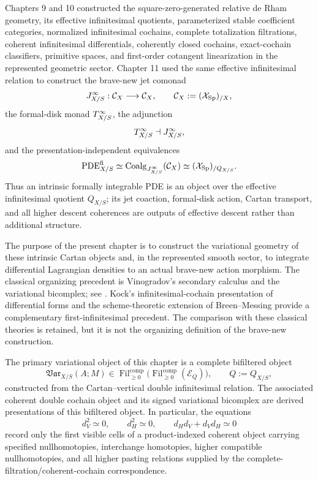 Chapters 9 and 10 constructed the square-zero-generated relative de Rham geometry, its effective infinitesimal quotients, parameterized stable coefficient categories, normalized infinitesimal cochains, complete totalization filtrations, coherent infinitesimal differentials, coherently closed cochains, exact-cochain classifiers, primitive spaces, and first-order cotangent linearization in the represented geometric sector. Chapter 11 used the same effective infinitesimal relation to construct the brave-new jet comonad
\[
    J^{\infty}_{X/S}:\mathcal C_X\longrightarrow\mathcal C_X,
    \qquad
    \mathcal C_X:=(\mathcal{X}_{\mathrm{Sp}})_{/X},
\]
the formal-disk monad \(T^{\infty}_{X/S}\), the adjunction
\[
    T^{\infty}_{X/S}\dashv J^{\infty}_{X/S},
\]
and the presentation-independent equivalences
\[
    \operatorname{PDE}^{\mathrm{fi}}_{X/S}
    \simeq
    \operatorname{Coalg}_{J^{\infty}_{X/S}}(\mathcal C_X)
    \simeq
    (\mathcal{X}_{\mathrm{Sp}})_{/Q_{X/S}}.
\]
Thus an intrinsic formally integrable PDE is an object over the effective infinitesimal quotient \(Q_{X/S}\); its jet coaction, formal-disk action, Cartan transport, and all higher descent coherences are outputs of effective descent rather than additional structure.

The purpose of the present chapter is to construct the variational geometry of these intrinsic Cartan objects and, in the represented smooth sector, to integrate differential Lagrangian densities to an actual brave-new action morphism. The classical organizing precedent is Vinogradov's secondary calculus and the variational bicomplex; see \cite{PuglieseSparanoVitagliano2023,Vitolo2000}. Kock's infinitesimal-cochain presentation of differential forms and the scheme-theoretic extension of Breen--Messing provide a complementary first-infinitesimal precedent. The comparison with these classical theories is retained, but it is not the organizing definition of the brave-new construction.

The primary variational object of this chapter is a complete bifiltered object
\[
    \mathfrak{Var}_{X/S}(A;M)
    \in
    \operatorname{Fil}^{\mathrm{comp}}_{\ge0}
    \bigl(
      \operatorname{Fil}^{\mathrm{comp}}_{\ge0}(\mathcal E_Q)
    \bigr),
    \qquad Q:=Q_{X/S},
\]
constructed from the Cartan--vertical double infinitesimal relation. The associated coherent double cochain object and its signed variational bicomplex are derived presentations of this bifiltered object. In particular, the equations
\[
    d_V^2\simeq0,
    \qquad
    d_H^2\simeq0,
    \qquad
    d_Hd_V+d_Vd_H\simeq0
\]
record only the first visible cells of a product-indexed coherent object carrying specified nullhomotopies, interchange homotopies, higher compatible nullhomotopies, and all higher pasting relations supplied by the complete-filtration/coherent-cochain correspondence.

